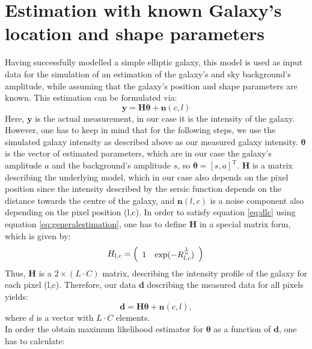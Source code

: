 \section{Estimation with known Galaxy's location and shape parameters}
Having successfully modelled a simple elliptic galaxy, this model is used as input data for the simulation of an estimation of the galaxy's and sky background's amplitude, while assuming that the galaxy's position and shape parameters are known. This estimation can be formulated via:
\begin{equation}
\boldsymbol{y}=\boldsymbol{H}\boldsymbol{\theta}+\boldsymbol{n}(c,l)
\label{eq:generalestimation}
\end{equation}
Here, $\boldsymbol{y}$ is the actual measurement, in our case it is the intensity of the galaxy. However, one has to keep in mind that for the  following steps, we use the simulated galaxy intensity as described above as our measured galaxy intensity. $\boldsymbol{\theta}$ is the vector of estimated parameters, which are in our case the galaxy's amplitude $a$ and the background's amplitude $s$, so $\boldsymbol{\theta}=[s,a]^{\mathrm{T}}$. $\boldsymbol{H}$ is a matrix describing the underlying model, which in our case also depends on the pixel position since the intensity described by the sersic function depends on the distance towards the centre of the galaxy, and $\boldsymbol{n}(l,c)$ is a noise component also depending on the pixel position (l,c). In order to satisfy equation \ref{eq:dlc} using equation \ref{eq:generalestimation}, one has to define $\boldsymbol{H}$ in a special matrix form, which is given by:
\begin{equation}
H_{l,c}=\left(\begin{array}{cc}1& \exp(-R_{l,c}^{\frac{1}{n}}) \end{array}\right)\\
\end{equation}
Thus, $\boldsymbol{H}$ is a $2\times (L\cdot C)$ matrix, describing the intensity profile of the galaxy for each pixel (l,c). Therefore, our data $\boldsymbol{d}$ describing the measured data for all pixels yields:
\begin{equation}
\boldsymbol{d}=\boldsymbol{H}\boldsymbol{\theta}+\boldsymbol{n}(c,l),
\label{eq:generalestimation}
\end{equation}
where $d$ is a vector with $L\cdot C$ elements.\\
\newline
In order the obtain maximum likelihood estimator for $\boldsymbol{\theta}$ as a function of $\boldsymbol{d}$, one has to calculate:
